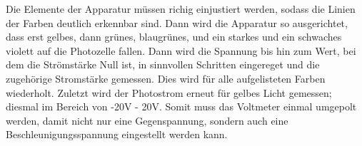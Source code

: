 Die Elemente der Apparatur müssen richig einjustiert werden, sodass die Linien der Farben deutlich erkennbar sind. Dann wird die Apparatur so ausgerichtet, dass erst gelbes, dann grünes, blaugrünes, und ein starkes und ein schwaches violett auf die Photozelle fallen.
Dann wird die Spannung bis hin zum Wert, bei dem die Strömstärke Null ist, in sinnvollen Schritten eingereget und die zugehörige Stromstärke gemessen.
Dies wird für alle aufgelisteten Farben wiederholt.
Zuletzt wird der Photostrom erneut für gelbes Licht gemessen; diesmal im Bereich von -20V - 20V. Somit muss das Voltmeter einmal umgepolt werden, damit nicht nur eine Gegenspannung, sondern auch eine Beschleunigungsspannung eingestellt werden kann.
